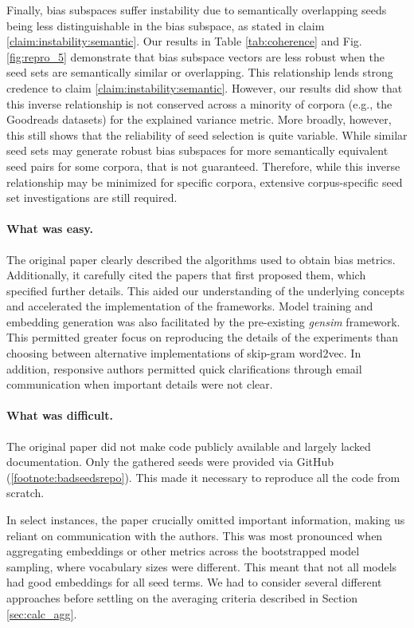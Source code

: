 Finally, bias subspaces suffer instability due to semantically overlapping seeds being less
distinguishable in the bias subspace, as stated in claim \ref{claim:instability:semantic}. Our
results in Table \ref{tab:coherence} and Fig. \ref{fig:repro_5} demonstrate that bias subspace
vectors are less robust when the seed sets are semantically similar or overlapping. This
relationship lends strong credence to claim \ref{claim:instability:semantic}. However, our results
did show that this inverse relationship is not conserved across a minority of corpora (e.g., the
Goodreads datasets) for the explained variance metric. More broadly, however, this still shows that
the reliability of seed selection is quite variable. While similar seed sets may generate robust
bias subspaces for more semantically equivalent seed pairs for some corpora, that is not guaranteed.
Therefore, while this inverse relationship may be minimized for specific corpora, extensive
corpus-specific seed set investigations are still required.

\paragraph{What was easy.} The original paper clearly described the algorithms used to obtain bias
metrics. Additionally, it carefully cited the papers that first proposed them, which specified
further details. This aided our understanding of the underlying concepts and accelerated the
implementation of the frameworks. Model training and embedding generation was also facilitated by
the pre-existing \emph{gensim} framework. This permitted greater focus on reproducing the details of
the experiments than choosing between alternative implementations of skip-gram word2vec. In
addition, responsive authors permitted quick clarifications through email communication when
important details were not clear.

\paragraph{What was difficult.} The original paper did not make code publicly available and largely
lacked documentation. Only the gathered seeds were provided via GitHub
(\ref{footnote:badseedsrepo}). This made it necessary to reproduce all the code from scratch.

In select instances, the paper crucially omitted important information, making us reliant on
communication with the authors. This was most pronounced when aggregating embeddings or other
metrics across the bootstrapped model sampling, where vocabulary sizes were different. This meant
that not all models had good embeddings for all seed terms. We had to consider several different
approaches before settling on the averaging criteria described in Section \ref{sec:calc_agg}.

